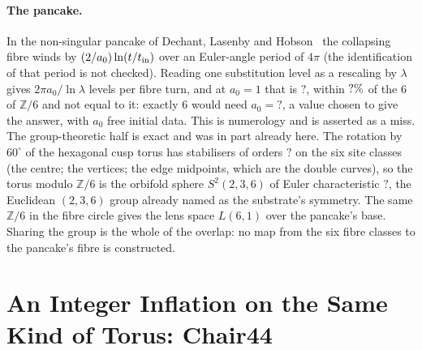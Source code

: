 \documentclass[11pt,a4paper]{article}
\newcommand{\SSCoAzeroSix}{?}\newcommand{\SSCoChecks}{?}\newcommand{\SSCoDim}{?}
\newcommand{\SSCoLevelsPerTurn}{?}\newcommand{\SSCoMultNum}{?}\newcommand{\SSCoNuEras}{?}
\newcommand{\SSCoOrbifoldChi}{?}\newcommand{\SSCoPeriod}{?}\newcommand{\SSCoStabOrders}{?}
\theoremstyle{plain}
\theoremstyle{definition}
\begin{document}
\paragraph{The pancake.} In the non-singular pancake of Dechant, Lasenby and
Hobson~\cite{DLH08} the collapsing fibre winds by $(2/a_0)\ln(t/t_{\rm in})$ over an Euler-angle
period of $4\pi$ (the identification of that period is not checked). Reading one substitution level as a
rescaling by $\lambda$ gives $2\pi a_0/\ln\lambda$ levels per fibre turn, and at $a_0=1$ that
is $\SSCoLevelsPerTurn{}$, within $?\%$ of the $6$ of $\mathbb Z/6$ and not equal to it: exactly
$6$ would need $a_0=\SSCoAzeroSix{}$, a value chosen to give the answer, with $a_0$ free initial data. This is
numerology and is asserted as a miss. The group-theoretic half is exact and was in part already
here. The rotation by $60^\circ$ of the hexagonal cusp torus has stabilisers of orders
$\SSCoStabOrders{}$ on the six site classes (the centre; the vertices; the edge midpoints, which are the
double curves), so the torus modulo $\mathbb Z/6$ is the orbifold sphere $S^2(2,3,6)$ of Euler characteristic
$\SSCoOrbifoldChi{}$, the Euclidean $(2,3,6)$ group already named as the substrate's symmetry. The same
$\mathbb Z/6$ in the fibre circle gives the lens space $L(6,1)$ over the pancake's base. Sharing the group is
the whole of the overlap: no map from the six fibre classes to the pancake's fibre is constructed.



\section{An Integer Inflation on the Same Kind of Torus: Chair44}
\label{sec:chair44}
\end{document}
